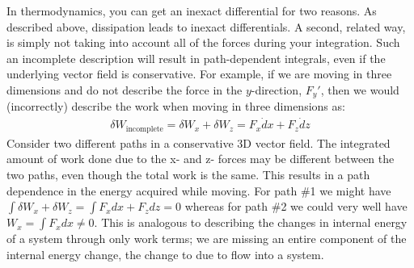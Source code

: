 \documentclass[12pt]{article}
\begin{document}
 In thermodynamics, you can get an inexact differential for two reasons. As described above, dissipation leads to inexact differentials. A second, related way, is simply not taking into account all of the forces during your integration. Such an incomplete description will result in path-dependent integrals, even if the underlying vector field is conservative. For example, if we are moving in three dimensions and do not describe the force in the $y$-direction, $F_y'$, then we would (incorrectly) describe the work when moving in three dimensions as:
\begin{align*}
\delta W_\text{incomplete} = \delta W_x + \delta W_z = F_x \dot dx + F_z \dot dz 
\end{align*}
Consider two different paths in a conservative 3D vector field.  The integrated amount of work done due to the x- and z- forces may be different between the two paths, even though the total work is the same. This results in a path dependence in the energy acquired while moving.  For path \#1 we might have $\int \delta W_x + \delta W_z = \int F_x dx + F_z dz = 0$ whereas for path \#2 we could very well have $W_x = \int F_x dx \neq 0$.  This is analogous to describing the changes in internal energy of a system through only work terms; we are missing an entire component of the internal energy change, the change to due to  flow into a system.
\end{document}
